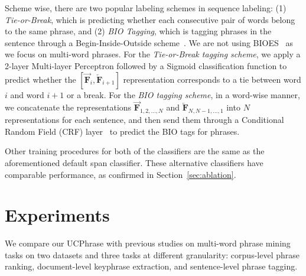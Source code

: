 \documentclass[sigconf]{acmart}
\newcommand{\our}{\mbox{UCPhrase}\xspace}
\begin{document}
\noindent Scheme wise, there are two popular labeling schemes in sequence labeling: (1) \emph{Tie-or-Break}, which is predicting whether each consecutive pair of words belong to the same phrase, and (2) \emph{BIO Tagging}, which is tagging phrases in the sentence through a Begin-Inside-Outside scheme~\cite{ramshaw1999text}. We are not using BIOES~\cite{ratinov2009design} as we focus on multi-word phrases.
For the \emph{Tie-or-Break tagging scheme}, we apply a 2-layer Multi-layer Perceptron followed by a Sigmoid classification function to predict whether the $[\overrightarrow{\mathbf{F}}_{i}, \overleftarrow{\mathbf{F}}_{i + 1}]$ representation corresponds to a tie between word $i$ and word $i + 1$ or a break. 
For the \emph{BIO tagging scheme}, in a word-wise manner, we concatenate the representations $\overrightarrow{\mathbf{F}}_{1, 2, \ldots, N}$ and $\overleftarrow{\mathbf{F}}_{N, N - 1, \ldots, 1}$ into $N$ representations for each sentence, and then send them through a Conditional Random Field (CRF) layer~\cite{lafferty2001conditional,huang2015bidirectional} to predict the BIO tags for phrases. 

Other training procedures for both of the classifiers are the same as the aforementioned default span classifier.
These alternative classifiers have comparable performance, as confirmed in Section~\ref{sec:ablation}.
 

\section{Experiments}

We compare our \our with previous studies on multi-word phrase mining tasks on two datasets and three tasks at different granularity: corpus-level phrase ranking, document-level keyphrase extraction, and sentence-level phrase tagging.
\end{document}
